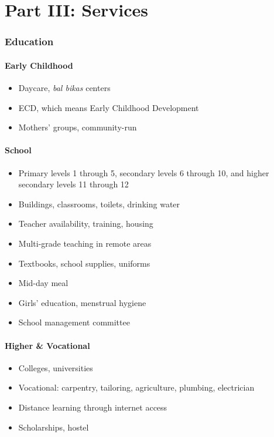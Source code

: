 \documentclass[11pt,a4paper]{article}
\begin{document}
\part{Part III: Services}

\section{Education}

\subsection{Early Childhood}
\begin{itemize}
    \item Daycare, \textit{bal bikas} centers
    \item ECD, which means Early Childhood Development
    \item Mothers' groups, community-run
\end{itemize}

\subsection{School}
\begin{itemize}
    \item Primary levels 1 through 5, secondary levels 6 through 10, and higher secondary levels 11 through 12
    \item Buildings, classrooms, toilets, drinking water
    \item Teacher availability, training, housing
    \item Multi-grade teaching in remote areas
    \item Textbooks, school supplies, uniforms
    \item Mid-day meal
    \item Girls' education, menstrual hygiene
    \item School management committee
\end{itemize}

\subsection{Higher \& Vocational}
\begin{itemize}
    \item Colleges, universities
    \item Vocational: carpentry, tailoring, agriculture, plumbing, electrician
    \item Distance learning through internet access
    \item Scholarships, hostel
\end{itemize}
\end{document}
